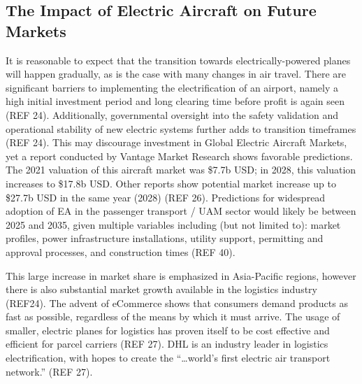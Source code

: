 \documentclass{article}
\begin{document}
\subsection{The Impact of Electric Aircraft on Future Markets}
It is reasonable to expect that the transition towards electrically-powered planes will happen gradually, as is the case with many changes in air travel. There are significant barriers to implementing the electrification of an airport, namely a high initial investment period and long clearing time before profit is again seen (REF 24).  Additionally, governmental oversight into the safety validation and operational stability of new electric systems further adds to transition timeframes (REF 24). This may discourage investment in Global Electric Aircraft Markets, yet a report conducted by Vantage Market Research shows favorable predictions. The 2021 valuation of this aircraft market was \$7.7b USD; in 2028, this valuation increases to \$17.8b USD. Other reports show potential market increase up to \$27.7b USD in the same year (2028) (REF 26). Predictions for widespread adoption of EA in the passenger transport / UAM sector would likely be between 2025 and 2035, given multiple variables including (but not limited to): market profiles, power infrastructure installations, utility support, permitting and approval processes, and construction times (REF 40).\par
This large increase in market share is emphasized in Asia-Pacific regions, however there is also substantial market growth available in the logistics industry (REF24). The advent of eCommerce shows that consumers demand products as fast as possible, regardless of the means by which it must arrive. The usage of smaller, electric planes for logistics has proven itself to be cost effective and efficient for parcel carriers (REF 27). DHL is an industry leader in logistics electrification, with hopes to create the “…world’s first electric air transport network.” (REF 27).\par
\end{document}

